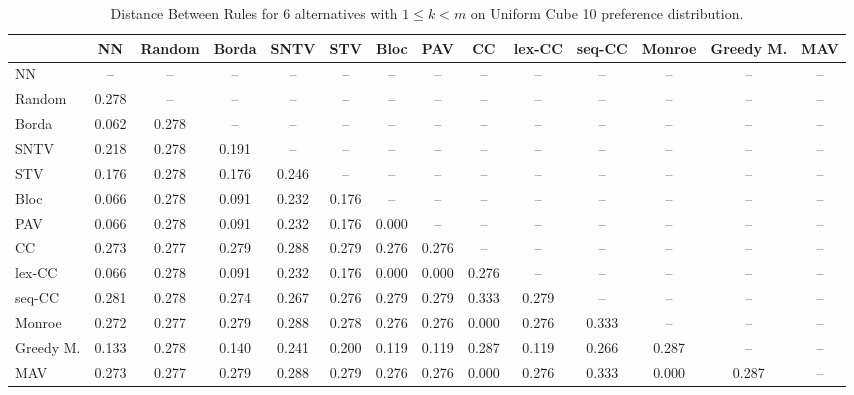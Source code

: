 
\begin{table*}
\centering
\begin{tabular}{lccccccccccccc}
\toprule
 & NN & Random & Borda & SNTV & STV & Bloc & PAV & CC & lex-CC & seq-CC & Monroe & Greedy M. & MAV \\
\midrule
NN & -- & -- & -- & -- & -- & -- & -- & -- & -- & -- & -- & -- & -- \\
Random & 0.278 & -- & -- & -- & -- & -- & -- & -- & -- & -- & -- & -- & -- \\
Borda & 0.062 & 0.278 & -- & -- & -- & -- & -- & -- & -- & -- & -- & -- & -- \\
SNTV & 0.218 & 0.278 & 0.191 & -- & -- & -- & -- & -- & -- & -- & -- & -- & -- \\
STV & 0.176 & 0.278 & 0.176 & 0.246 & -- & -- & -- & -- & -- & -- & -- & -- & -- \\
Bloc & 0.066 & 0.278 & 0.091 & 0.232 & 0.176 & -- & -- & -- & -- & -- & -- & -- & -- \\
PAV & 0.066 & 0.278 & 0.091 & 0.232 & 0.176 & 0.000 & -- & -- & -- & -- & -- & -- & -- \\
CC & 0.273 & 0.277 & 0.279 & 0.288 & 0.279 & 0.276 & 0.276 & -- & -- & -- & -- & -- & -- \\
lex-CC & 0.066 & 0.278 & 0.091 & 0.232 & 0.176 & 0.000 & 0.000 & 0.276 & -- & -- & -- & -- & -- \\
seq-CC & 0.281 & 0.278 & 0.274 & 0.267 & 0.276 & 0.279 & 0.279 & 0.333 & 0.279 & -- & -- & -- & -- \\
Monroe & 0.272 & 0.277 & 0.279 & 0.288 & 0.278 & 0.276 & 0.276 & 0.000 & 0.276 & 0.333 & -- & -- & -- \\
Greedy M. & 0.133 & 0.278 & 0.140 & 0.241 & 0.200 & 0.119 & 0.119 & 0.287 & 0.119 & 0.266 & 0.287 & -- & -- \\
MAV & 0.273 & 0.277 & 0.279 & 0.288 & 0.279 & 0.276 & 0.276 & 0.000 & 0.276 & 0.333 & 0.000 & 0.287 & -- \\
\bottomrule
\end{tabular}

\caption{Distance Between Rules for 6 alternatives with $1 \leq k < m$ on Uniform Cube 10 preference distribution.}
\end{table*}
